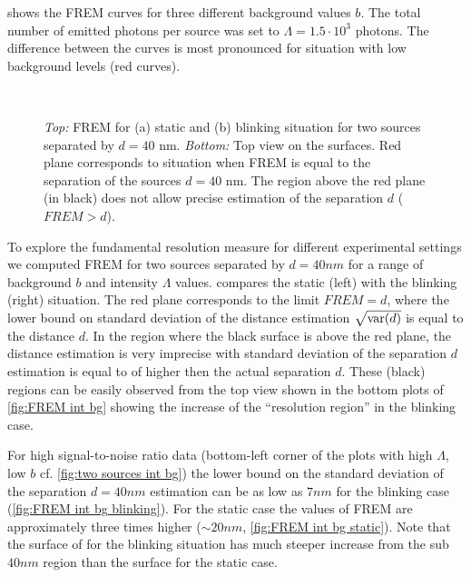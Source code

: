  shows the FREM curves for three different background values $b$. The total number of emitted photons per source was set to $\Lambda =1.5\cdot 10^3$ photons. The difference between the curves is most pronounced for situation with low background levels (red curves). 

\begin{figure}[!b]
	\centering
	\newcommand{\wf}{.48\textwidth}
	\\
	\caption{{\it Top:} FREM for (a) static and (b) blinking situation for two sources separated by $d=40$ nm. {\it Bottom:} Top view on the surfaces. Red plane corresponds to situation when FREM is equal to the separation of the sources $d=40$ nm. The region above the red plane (in black) does not allow precise estimation of the separation $d$ ($\unit{FREM}>d$).}
	\label{fig:FREM int bg}
\end{figure}
%
To explore the fundamental resolution measure for different experimental settings we computed FREM for two sources separated by $d=40\unit{nm}$ for a range of background $b$ and intensity  $\Lambda$ values.  compares the static (left) with the blinking (right) situation. The red plane corresponds to the limit $\unit{FREM}=d$, where the lower bound on standard deviation of the distance estimation $\sqrt{\mathrm{var}(d)}$ is equal to the distance $d$. In the region where the black surface is above the red plane, the distance estimation is very imprecise with standard deviation of the separation $d$ estimation is equal to of higher then the actual separation $d$. These (black) regions can be easily observed from the top view shown in the bottom plots of \autoref{fig:FREM int bg} showing the increase of the ``resolution region'' in the blinking case. 

For high signal-to-noise ratio data (bottom-left corner of the plots with high $\Lambda$, low $b$ cf. \autoref{fig:two sources int bg}) the lower bound on the standard deviation of the separation $d=40\unit{nm}$ estimation can be as low as $7\unit{nm}$ for the blinking case (\autoref{fig:FREM int bg blinking}). For the static case the values of FREM are approximately three times higher ($\sim 20\unit{nm}$,  \autoref{fig:FREM int bg static}). Note that the surface of for the blinking situation has much steeper increase from the sub $40\unit{nm}$ region than the surface for the static case.

